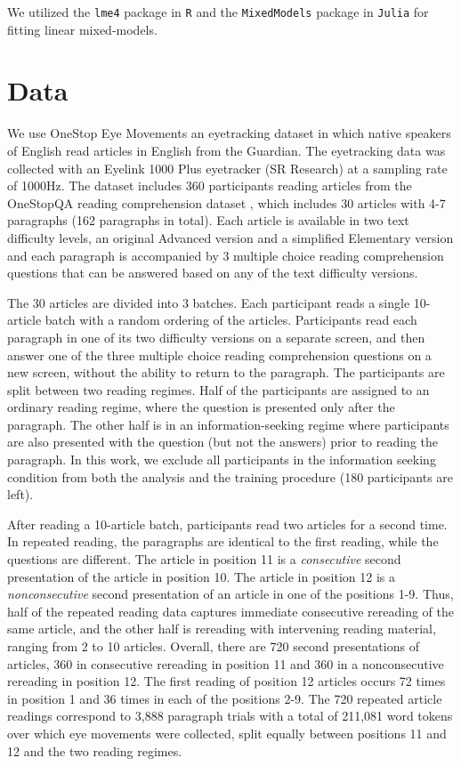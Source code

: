 We utilized the \texttt{lme4} package in \texttt{R} \cite{Bates2015-ts} and the \texttt{MixedModels} package in \texttt{Julia} \cite{alday_2025_14838413} for fitting linear mixed-models.

\section{Data}
\label{sec:app-data}

We use OneStop Eye Movements \cite{onestop2025preprint} an eyetracking dataset in which native speakers of English read articles in English from the Guardian. The eyetracking data was collected with an Eyelink 1000 Plus eyetracker (SR Research) at a sampling rate of 1000Hz. The dataset includes 360 participants reading articles from the OneStopQA reading comprehension dataset \citep{berzak_starc_2020}, which includes 30 articles with 4-7 paragraphs (162 paragraphs in total). Each article is available in two text difficulty levels, an original Advanced version and a simplified Elementary version and each paragraph is accompanied by 3 multiple choice reading comprehension questions that can be answered based on any of the text difficulty versions. 

The 30 articles are divided into 3 batches. Each participant reads a single 10-article batch with a random ordering of the articles. Participants read each paragraph in one of its two difficulty versions on a separate screen, and then answer one of the three multiple choice reading comprehension questions on a new screen, without the ability to return to the paragraph. The participants are split between two reading regimes. Half of the participants are assigned to an ordinary reading regime, where the question is presented only after the paragraph. The other half is in an information-seeking regime where participants are also presented with the question (but not the answers) prior to reading the paragraph. In this work, we exclude all participants in the information seeking condition from both the analysis and the training procedure (180 participants are left).

After reading a 10-article batch, participants read two articles for a second time. In repeated reading, the paragraphs are identical to the first reading, while the questions are different. The article in position 11 is a \emph{consecutive} second presentation of the article in position 10. The article in position 12 is a \emph{nonconsecutive} second presentation of an article in one of the positions 1-9. Thus, half of the repeated reading data captures immediate consecutive rereading of the same article, and the other half is rereading with intervening reading material, ranging from 2 to 10 articles. Overall, there are 720 second presentations of articles, 360 in consecutive rereading in position 11 and 360 in a nonconsecutive rereading in position 12. The first reading of position 12 articles occurs 72 times in position 1 and 36 times in each of the positions 2-9. The 720 repeated article readings correspond to 3,888 paragraph trials with a total of 211,081 word tokens over which eye movements were collected, split equally between positions 11 and 12 and the two reading regimes.

